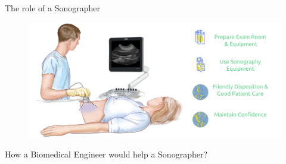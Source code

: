 {
    \begin{frame}{The role of a Sonographer}
      \begin{figure}
        \centering
        \includegraphics[width=1.0\textwidth]{./../figures/sonographer/versions/drawing-v02.png}
      \end{figure}
\end{frame}
}



{
\begin{frame}{}

\BigSizeFont
\begin{center}
    How a Biomedical Engineer would help a Sonographer?
\end{center}

\end{frame}
}
